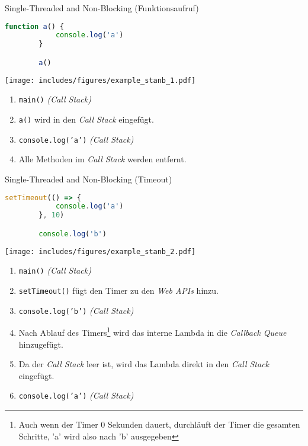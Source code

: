 \begin{example}{Single-Threaded and Non-Blocking (Funktionsaufruf)}
    \begin{lstlisting}[language=JavaScript]
        function a() {
            console.log('a')            
        }

        a()
    \end{lstlisting}

    \texttt{[image: includes/figures/example\_stanb\_1.pdf]}

    \begin{enumerate}
        \item \texttt{main()} \emph{(Call Stack)}
        \item \texttt{a()} wird in den \emph{Call Stack} eingefügt.
        \item \texttt{console.log('a')} \emph{(Call Stack)}
        \item Alle Methoden im \emph{Call Stack} werden entfernt.
    \end{enumerate}
\end{example}

\begin{example}{Single-Threaded and Non-Blocking (Timeout)}
    \begin{lstlisting}[language=JavaScript]
        setTimeout(() => {
            console.log('a')
        }, 10)

        console.log('b')
    \end{lstlisting}

    \texttt{[image: includes/figures/example\_stanb\_2.pdf]}

    \begin{enumerate}
        \item \texttt{main()} \emph{(Call Stack)}
        \item \texttt{setTimeout()} fügt den Timer zu den \emph{Web APIs} hinzu.
        \item \texttt{console.log('b')} \emph{(Call Stack)}
        \item Nach Ablauf des Timers\footnote{Auch wenn der Timer 0 Sekunden dauert, durchläuft der Timer die gesamten Schritte, 'a' wird also nach 'b' ausgegeben} wird das interne Lambda in die \emph{Callback Queue} hinzugefügt.
        \item Da der \emph{Call Stack} leer ist, wird das Lambda direkt in den \emph{Call Stack} eingefügt.
        \item \texttt{console.log('a')} \emph{(Call Stack)}
    \end{enumerate}
\end{example}

